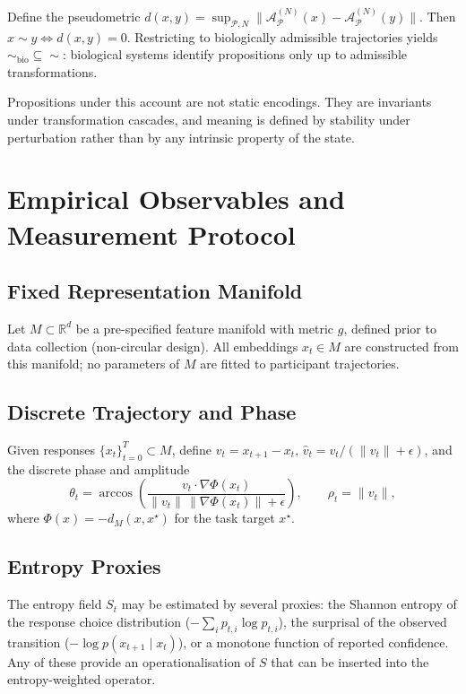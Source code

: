 \documentclass[12pt, a4paper]{article}
\theoremstyle{remark}
\theoremstyle{definition}
\begin{document}
Define the pseudometric
$d(x,y) = \sup_{\mathcal{P},N}\|\mathcal{A}^{(N)}_{\mathcal{P}}(x) -
\mathcal{A}^{(N)}_{\mathcal{P}}(y)\|$.
Then $x \sim y \iff d(x,y) = 0$.  Restricting to biologically admissible trajectories
yields ${\sim}_{\mathrm{bio}} \subseteq {\sim}$: biological systems identify propositions
only up to admissible transformations.

Propositions under this account are not static encodings.  They are invariants under
transformation cascades, and meaning is defined by stability under perturbation rather than
by any intrinsic property of the state.

\section{Empirical Observables and Measurement Protocol}
\label{app:measurement}

\subsection{Fixed Representation Manifold}

Let $M \subset \mathbb{R}^d$ be a pre-specified feature manifold with metric $g$, defined
prior to data collection (non-circular design).  All embeddings $x_t \in M$ are
constructed from this manifold; no parameters of $M$ are fitted to participant trajectories.

\subsection{Discrete Trajectory and Phase}

Given responses $\{x_t\}_{t=0}^T \subset M$, define $v_t = x_{t+1} - x_t$,
$\hat{v}_t = v_t/(\|v_t\|+\epsilon)$, and the discrete phase and amplitude
\[
\theta_t = \arccos\!\left(
\frac{v_t \cdot \nabla\Phi(x_t)}{\|v_t\|\,\|\nabla\Phi(x_t)\|+\epsilon}
\right),
\qquad
\rho_t = \|v_t\|,
\]
where $\Phi(x) = -d_M(x, x^\star)$ for the task target $x^\star$.

\subsection{Entropy Proxies}

The entropy field $S_t$ may be estimated by several proxies: the Shannon entropy of the
response choice distribution ($-\sum_i p_{t,i}\log p_{t,i}$), the surprisal of the
observed transition ($-\log p(x_{t+1}\mid x_t)$), or a monotone function of reported
confidence.  Any of these provide an operationalisation of $S$ that can be inserted into
the entropy-weighted operator.
\end{document}
